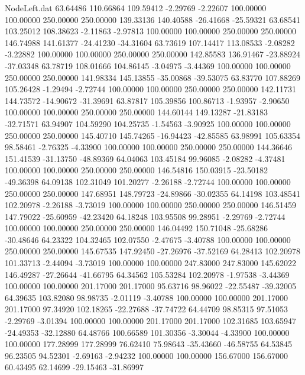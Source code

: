 \begin{filecontents}{NodeLeft.dat}
  63.64486  110.66864  109.59412    -2.29769   -2.22607  100.00000  100.00000  250.00000  250.00000  139.33136  140.40588  -26.41668  -25.59321
  63.68541  103.25012  108.38623    -2.11863   -2.97813  100.00000  100.00000  250.00000  250.00000  146.74988  141.61377  -24.41230  -34.31604
  63.73619  107.14417  113.08533    -2.08282   -3.22882  100.00000  100.00000  250.00000  250.00000  142.85583  136.91467  -23.88924  -37.03348
  63.78719  108.01666  104.86145    -3.04975   -3.44369  100.00000  100.00000  250.00000  250.00000  141.98334  145.13855  -35.00868  -39.53075
  63.83770  107.88269  105.26428    -1.29494   -2.72744  100.00000  100.00000  250.00000  250.00000  142.11731  144.73572  -14.90672  -31.39691
  63.87817  105.39856  100.86713    -1.93957   -2.90650  100.00000  100.00000  250.00000  250.00000  144.60144  149.13287  -21.83183  -32.71571
  63.94907  104.59290  104.25735    -1.54563   -3.90925  100.00000  100.00000  250.00000  250.00000  145.40710  145.74265  -16.94423  -42.85585
  63.98991  105.63354   98.58461    -2.76325   -4.33900  100.00000  100.00000  250.00000  250.00000  144.36646  151.41539  -31.13750  -48.89369
  64.04063  103.45184   99.96085    -2.08282   -4.37481  100.00000  100.00000  250.00000  250.00000  146.54816  150.03915  -23.50182  -49.36398
  64.09138  102.31049  101.20277    -2.26188   -2.72744  100.00000  100.00000  250.00000  250.00000  147.68951  148.79723  -24.89866  -30.02355
  64.14198  103.48541  102.20978    -2.26188   -3.73019  100.00000  100.00000  250.00000  250.00000  146.51459  147.79022  -25.60959  -42.23420
  64.18248  103.95508   99.28951    -2.29769   -2.72744  100.00000  100.00000  250.00000  250.00000  146.04492  150.71048  -25.68286  -30.48646
  64.23322  104.32465  102.07550    -2.47675   -3.40788  100.00000  100.00000  250.00000  250.00000  145.67535  147.92450  -27.26976  -37.52169
  64.28413  102.20978  101.33713    -2.44094   -3.73019  100.00000  100.00000  247.83000  247.83000  145.62022  146.49287  -27.26644  -41.66795
  64.34562  105.53284  102.20978    -1.97538   -3.44369  100.00000  100.00000  201.17000  201.17000   95.63716   98.96022  -22.55487  -39.32005
  64.39635  103.82080   98.98735    -2.01119   -3.40788  100.00000  100.00000  201.17000  201.17000   97.34920  102.18265  -22.27688  -37.74722
  64.44709   98.85315   97.51053    -2.29769   -3.01394  100.00000  100.00000  201.17000  201.17000  102.31685  103.65947  -24.49353  -32.12880
  64.48766  100.66589  101.30356    -3.30044   -4.33900  100.00000  100.00000  177.28999  177.28999   76.62410   75.98643  -35.43660  -46.58755
  64.53845   96.23505   94.52301    -2.69163   -2.94232  100.00000  100.00000  156.67000  156.67000   60.43495   62.14699  -29.15463  -31.86997

\end{filecontents}
